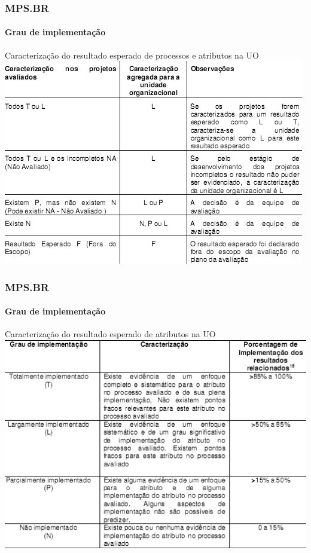 \begin{frame}
	\frametitle{MPS.BR}
	\framesubtitle{Grau de implementação}
	
	\begin{block:fact}{Caracterização do resultado esperado de processos e
	atributos na UO}
		\centering
		\includegraphics[width=.95\textwidth]{software-engineering/project-management/process/process-quality/mpsbr/mpsbr-implementation-ratings-uo}
	\end{block:fact}
\end{frame}


\begin{frame}
	\frametitle{MPS.BR}
	\framesubtitle{Grau de implementação}
	
	\begin{block:fact}{Caracterização do resultado esperado de atributos na UO}
		\centering
		\includegraphics[width=\textwidth]{software-engineering/project-management/process/process-quality/mpsbr/mpsbr-attribute-ratings-uo}
	\end{block:fact}
\end{frame}



